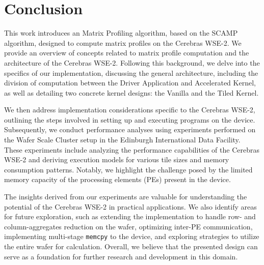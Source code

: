 \chapter{Conclusion}\label{chapter:conclusion}


This work introduces an Matrix Profiling algorithm, based on the SCAMP algorithm, designed to compute matrix profiles on the Cerebras WSE-2. We provide an overview of concepts related to matrix profile computation and the architecture of the Cerebras WSE-2. Following this background, we delve into the specifics of our implementation, discussing the general architecture, including the division of computation between the Driver Application and Accelerated Kernel, as well as detailing two concrete kernel designs: the Vanilla and the Tiled Kernel.

We then address implementation considerations specific to the Cerebras WSE-2, outlining the steps involved in setting up and executing programs on the device. Subsequently, we conduct performance analyses using experiments performed on the Wafer Scale Cluster setup in the Edinburgh International Data Facility. These experiments include analyzing the performance capabilities of the Cerebras WSE-2 and deriving execution models for various tile sizes and memory consumption patterns. Notably, we highlight the challenge posed by the limited memory capacity of the processing elements (PEs) present in the device.

The insights derived from our experiments are valuable for understanding the potential of the Cerebras WSE-2 in practical applications. We also identify areas for future exploration, such as extending the implementation to handle row- and column-aggregates reduction on the wafer, optimizing inter-PE communication, implementing multi-stage \texttt{memcpy} to the device, and exploring strategies to utilize the entire wafer for calculation. Overall, we believe that the presented design can serve as a foundation for further research and development in this domain.